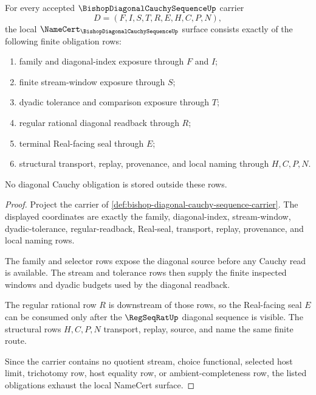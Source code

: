 \begin{theorem}
\label{thm:bishop-diagonal-cauchy-sequence-namecert-obligations}
For every accepted $\BishopDiagonalCauchySequenceUp$ carrier
$$
D=(F,I,S,T,R,E,H,C,P,N),
$$
the local $\NameCert_{\BishopDiagonalCauchySequenceUp}$ surface consists exactly of the following finite obligation rows:
\begin{enumerate}
\item family and diagonal-index exposure through $F$ and $I$;
\item finite stream-window exposure through $S$;
\item dyadic tolerance and comparison exposure through $T$;
\item regular rational diagonal readback through $R$;
\item terminal Real-facing seal through $E$;
\item structural transport, replay, provenance, and local naming through $H,C,P,N$.
\end{enumerate}
No diagonal Cauchy obligation is stored outside these rows.
\end{theorem}
\begin{proof}
Project the carrier of \autoref{def:bishop-diagonal-cauchy-sequence-carrier}. The displayed coordinates are exactly the family, diagonal-index, stream-window, dyadic-tolerance, regular-readback, Real-seal, transport, replay, provenance, and local naming rows.

The family and selector rows expose the diagonal source before any Cauchy read is available. The stream and tolerance rows then supply the finite inspected windows and dyadic budgets used by the diagonal readback.

The regular rational row $R$ is downstream of those rows, so the Real-facing seal $E$ can be consumed only after the $\RegSeqRatUp$ diagonal sequence is visible. The structural rows $H,C,P,N$ transport, replay, source, and name the same finite route.

Since the carrier contains no quotient stream, choice functional, selected host limit, trichotomy row, host equality row, or ambient-completeness row, the listed obligations exhaust the local NameCert surface.
\end{proof}

